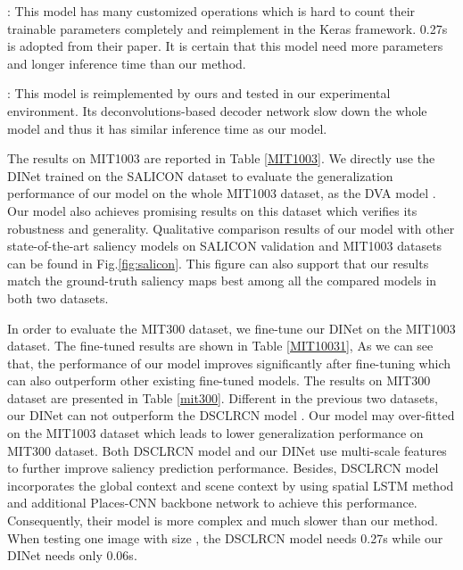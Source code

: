 \begin{table*}[]
\begin{threeparttable}
\begin{tablenotes}
	\item  : This model has many customized operations which is hard to count their trainable parameters completely and reimplement in the Keras framework. 0.27s is adopted from their paper. It is certain that this model need more parameters and longer inference time than our method.
	\item  : This model is reimplemented by ours and tested in our experimental environment. Its deconvolutions-based decoder network slow down the whole model and thus it has similar inference time as our model. 
\end{tablenotes}
\end{threeparttable}
	\vspace{-4mm}

\end{table*}

The results on MIT1003 are reported in Table \ref{MIT1003}. We directly use the DINet trained on the SALICON dataset to evaluate the generalization performance of our model on the whole MIT1003 dataset, as the DVA model \cite{wang2017deep}. Our model also achieves promising results on this dataset which verifies its robustness and generality. Qualitative comparison results of our model with other state-of-the-art saliency models on SALICON validation and MIT1003 datasets can be found in Fig.\ref{fig:salicon}. This figure can also support that our results match the ground-truth saliency maps best among all the compared models in both two datasets.

In order to evaluate the MIT300 dataset, we fine-tune our DINet on the MIT1003 dataset. The fine-tuned results are shown in Table \ref{MIT10031}, As we can see that, the performance of our model improves significantly after fine-tuning which can also outperform other existing fine-tuned models. The results on MIT300 dataset are presented in Table \ref{mit300}. Different in the previous two datasets, our DINet can not outperform the DSCLRCN model \cite{liu2016deep}. Our model may over-fitted on the MIT1003 dataset which leads to lower generalization performance on MIT300 dataset. Both DSCLRCN model and our DINet use multi-scale features to further improve saliency prediction performance. Besides, DSCLRCN model incorporates the global context and scene context by using spatial LSTM \cite{visin2015renet} method and additional Places-CNN \cite{zhou2014learning} backbone network to achieve this performance. Consequently, their model is more complex and much slower than our method. When testing one image with size , the DSCLRCN model needs 0.27s while our DINet needs only 0.06s.   


